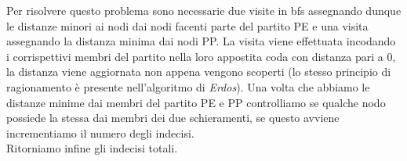 \documentclass[../cheatSheetAlgoritmi.tex]{subfiles}
\begin{document}
Per risolvere questo problema sono necessarie due visite in bfs assegnando dunque le distanze minori ai nodi dai nodi facenti parte del partito PE e una visita assegnando la distanza minima dai nodi PP. La visita viene effettuata incodando i corrispettivi membri del partito nella loro appostita coda con distanza pari a 0, la distanza viene aggiornata non appena vengono scoperti (lo stesso principio di ragionamento è presente nell'algoritmo di \textit{Erdos}). Una volta che abbiamo le distanze minime dai membri del partito PE e PP controlliamo se qualche nodo possiede la stessa dai membri dei due schieramenti, se questo avviene incrementiamo il numero degli indecisi.\\
Ritorniamo infine gli indecisi totali.
\end{document}
